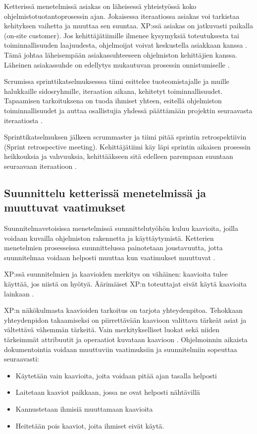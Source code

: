 \documentclass[finnish]{tktltiki2}
\theoremstyle{definition}
\theoremstyle{remark}
\begin{document}
Ketterissä menetelmissä asiakas on läheisessä yhteistyössä koko ohjelmistotuotantoprosessin ajan. Jokaisessa iteraatiossa asiakas voi tarkistaa kehityksen vaihetta ja muuttaa sen suuntaa. XP:ssä asiakas on jatkuvasti paikalla (on-site customer). Jos kehittäjätiimille ilmenee kysymyksiä toteutuksesta tai toiminnallisuuden laajuudesta, ohjelmoijat voivat keskustella asiakkaan kanssa \cite{BEC99}. Tämä johtaa läheisempään asiakassuhteeseen ohjelmiston kehittäjien kanssa. Läheinen asiakassuhde on edellytys mukautuvan prosessin onnistumiselle \cite{FOW01a}.

Scrumissa sprinttikatselmuksesssa tiimi esittelee tuoteomistajalle ja muille halukkaille sidosryhmille, iteraation aikana, kehitetyt toiminnallisuudet. Tapaamisen tarkoituksena on tuoda ihmiset yhteen, esitellä ohjelmiston toiminnallisuudet ja auttaa osallistujia yhdessä päättämään projektin seuraavasta iteraatiosta \cite{SCH09}.

Sprinttikatselmuksen jälkeen scrummaster ja tiimi pitää sprintin retrospektiivin (Sprint retrospective meeting). Kehittäjätiimi käy läpi sprintin aikaisen prosessin heikkouksia ja vahvuuksia, kehittääkseen sitä edelleen parempaan suuntaan seuraavaan iteraatioon \cite{SCH09}.


\subsection{Suunnittelu ketterissä menetelmissä ja muuttuvat vaatimukset}

Suunnitelmavetoisissa menetelmissä suunnittelutyöhön kuluu kaavioita, joilla voidaan kuvailla ohjelmiston rakennetta ja käyttäytymistä. Ketterien menetelmien prosesseissa suunnittelussa painotetaan joustavuutta, jotta suunnitelmaa voidaan helposti muuttaa kun vaatimukset muuttuvat \cite{FOW01b}.

XP:ssä suunnitelmien ja kaavioiden merkitys on vähäinen: kaavioita tulee käyttää, jos niistä on hyötyä. Äärimäiset XP:n toteuttajat eivät käytä kaavioita lainkaan \cite{FOW01b}.

XP:n näkökulmasta kaavioiden tarkoitus on tarjota yhteydenpitoa. Tehokkaan yhteydenpidon takaamiseksi on piirrettävään kaavioon valittava tärkeät asiat ja vältettävä vähemmän tärkeitä. Vain merkitykselliset luokat sekä niiden tärkeimmät attribuutit ja operaatiot kuvataan kaavioon \cite{FOW01b}.
Ohjelmoinnin aikaista dokumentointia voidaan muuttuviin vaatimuksiin ja suunnitelmiin sopeuttaa seuraavasti: \cite{FOW01b}

\begin{itemize}
\item Käytetään vain kaavioita, joita voidaan pitää ajan tasalla helposti
\item Laitetaan kaaviot paikkaan, jossa ne ovat helposti nähtävillä
\item Kannustetaan ihmisiä muuttamaan kaavioita
\item Heitetään pois kaaviot, joita ihmiset eivät käytä.
\end{itemize}
\end{document}
